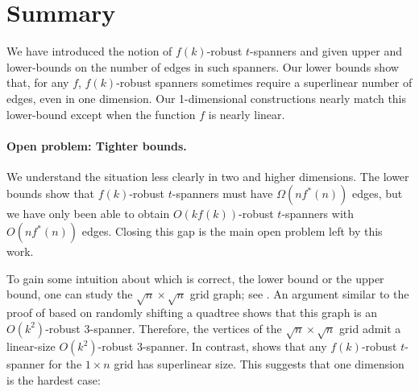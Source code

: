 \documentclass{cccg12}
\newcommand{\eps}{\varepsilon}
\begin{document}
%
%

\section{Summary}

We have introduced the notion of $f(k)$-robust $t$-spanners and given
upper and lower-bounds on the number of edges in such spanners.  Our lower
bounds show that, for any $f$, $f(k)$-robust spanners sometimes require
a superlinear number of edges, even in one dimension.  Our 1-dimensional
constructions nearly match this lower-bound except when the function
$f$ is nearly linear.

\paragraph{Open problem: Tighter bounds.}
We understand the situation less clearly in two and higher dimensions.
The lower bounds show that $f(k)$-robust $t$-spanners must have
$\Omega(nf^*(n))$ edges, but we have only been able to obtain
$O(kf(k))$-robust $t$-spanners with $O(nf^*(n))$ edges.  Closing this
gap is the main open problem left by this work.

To gain some intuition about which is correct, the lower bound
or the upper bound, one can study the $\sqrt{n}\times\sqrt{n}$
grid graph; see .  An argument similar to the proof of
 based on randomly shifting a quadtree shows that this
graph is an $O(k^2)$-robust $3$-spanner.  Therefore, the vertices of
the $\sqrt{n}\times\sqrt{n}$ grid admit a linear-size $O(k^2)$-robust
3-spanner.  In contrast,  shows that any
$f(k)$-robust $t$-spanner for the $1\times n$ grid has superlinear size.
This suggests that one dimension is the hardest case:
\end{document}
